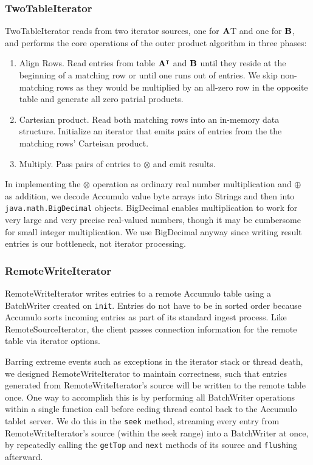 \subsubsection{TwoTableIterator}
TwoTableIterator reads from two iterator sources, one for $\mathbf{A}$T and one for $\mathbf{B}$,
and performs the core operations of the outer product algorithm in three phases:
\begin{enumerate}
\item Align Rows.  Read entries from table $\mathbf{A^{\intercal}}$ and $\mathbf{B}$ until they reside at the beginning of a matching row
or until one runs out of entries. We skip non-matching rows as they would be multiplied by an all-zero row in the
opposite table and generate all zero patrial products.
\item Cartesian product. Read both matching rows into an in-memory data structure. 
Initialize an iterator that emits pairs of entries from the the matching rows' Carteisan product.
\item Multiply. Pass pairs of entries to $\otimes$ and emit results. 
\end{enumerate}

In implementing the $\otimes$ operation as ordinary real number multiplication and $\oplus$ as addition,
we decode Accumulo value byte arrays into Strings and then into \texttt{java.math.BigDecimal}
objects. BigDecimal enables multiplication to work for very large and very precise real-valued numbers,
though it may be cumbersome for small integer multiplication. We use BigDecimal anyway since 
writing result entries is our bottleneck, not iterator processing.

\subsubsection{RemoteWriteIterator}
RemoteWriteIterator writes entries to a remote Accumulo table using a BatchWriter created on \texttt{init}.
Entries do not have to be in sorted order because Accumulo sorts incoming entries as part of its
standard ingest process. Like RemoteSourceIterator, the client passes connection information 
for the remote table via iterator options.

Barring extreme events such as exceptions in the iterator stack or thread death,
we designed RemoteWriteIterator to maintain correctness, such that entries generated from
RemoteWriteIterator's source will be written to the remote table once.
One way to accomplish this is by performing all BatchWriter operations within a single function call
before ceding thread contol back to the Accumulo tablet server.  We do this in the \texttt{seek} method,
streaming every entry from RemoteWriteIterator's source (within the seek range) into a BatchWriter at once, 
by repeatedly calling the \texttt{getTop} and \texttt{next} methods of its source and \texttt{flush}ing afterward.

